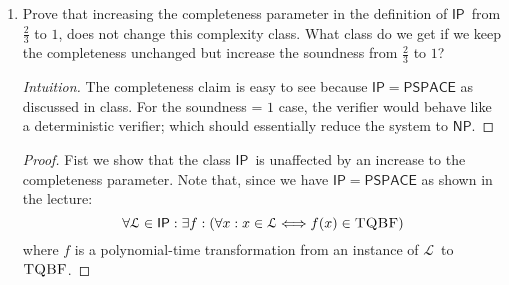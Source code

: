 \documentclass[usletter]{article}
\newcommand {\langset}[1]      {\ensuremath{\mathcal{#1}}}
\newcommand {\namedlangset}[1] {\ensuremath{\textnormal{\textsc{#1}}}}
\newcommand {\family}[1]       {\ensuremath{\mathsf{#1}}}
\newcommand {\langL}          {\langset{L}}
\newcommand {\IP}     {\family{IP}}
\newcommand {\NP}     {\family{NP}}
\newcommand {\PSPACE} {\family{PSPACE}}
\begin{document}
\begin{enumerate}[labelsep=2.5em, label=\textbf{\arabic{enumi}}]
\begin{proof}[Solution]
    The call to function \texttt{RemoveVertices}, simply removes all supplied
    vertices from the provided graph, along with all of their incoming and
    outgoing edges.

    Soundness and completeness of \texttt{FirstPlayerWins} are directly observed
    since the algorithm explores all possible moves for both players.

    We now show that \texttt{FirstPlayerWins} uses polynomial-space. \\
    Let the space usage of \texttt{FirstPlayerWins} as a function of the
    argument graph $G$ be $S(G)$. Since during each recursive call, we only
    store $\langle G, x_i, x_j \rangle$ on the stack;
    \begin{align*}
      S(G) &= S(G') + |G| + 2
           & G' = \text{\tt RemoveVertices}(G, \{x_i, x_j\}) \\
           &= S(G') + O(n^2) & n = |V_G |
    \end{align*}
    Since we remove $2$ vertices from $G$ to obtain $G'$, the maximum depth of
    recursion can be $\frac{n}{2}$. Now, unrolling the recursive relation
    gives us $S(G) = O(n^3)$.

    Therefore \texttt{FirstPlayerWins} runs in space, polynomial in size of
    the input graph $G$.
  \end{proof}


  \item Prove that increasing the completeness parameter in the definition of
        \IP\ from $\frac{2}{3}$ to $1$, does not change this complexity class.
        What class do we get if we keep the completeness unchanged but increase
        the soundness from $\frac{2}{3}$ to $1$?
  \begin{proof}[Intuition]
    The completeness claim is easy to see because $\IP = \PSPACE$ as discussed
    in class. For the soundness = $1$ case, the verifier would behave like a
    deterministic verifier; which should essentially reduce the system to \NP.
  \end{proof}
  \begin{proof}
    Fist we show that the class \IP\ is unaffected by an increase to the
    completeness parameter. Note that, since we have $\IP = \PSPACE$ as shown in
    the lecture:
    $$
    \forall \langL \in \IP : \exists f :
    (\forall x : x \in \langL \Longleftrightarrow f(x) \in \namedlangset{TQBF})
    $$
    where $f$ is a polynomial-time transformation from an instance of \langL\ to
    \namedlangset{TQBF}.


\end{proof}
\end{enumerate}
\end{document}
